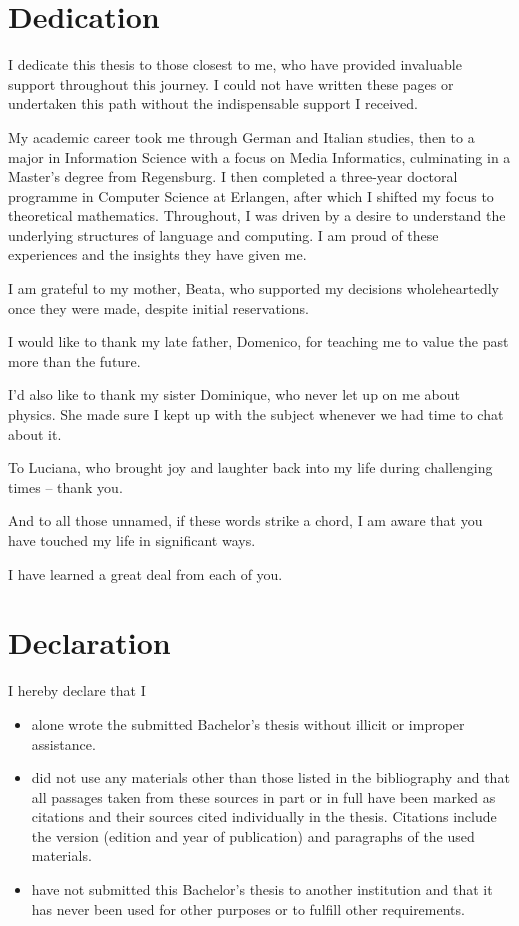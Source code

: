 \documentclass[b5paper, 11pt, twoside]{report}
\begin{document}
\chapter*{Dedication}
I dedicate this thesis to those closest to me, who have provided invaluable support throughout this journey. I could not have written these pages or undertaken this path without the indispensable support I received.

My academic career took me through German and Italian studies, then to a major in Information Science with a focus on Media Informatics, culminating in a Master's degree from Regensburg. I then completed a three-year doctoral programme in Computer Science at Erlangen, after which I shifted my focus to theoretical mathematics. Throughout, I was driven by a desire to understand the underlying structures of language and computing. I am proud of these experiences and the insights they have given me.

I am grateful to my mother, Beata, who supported my decisions wholeheartedly once they were made, despite initial reservations.

I would like to thank my late father, Domenico, for teaching me to value the past more than the future.

I'd also like to thank my sister Dominique, who never let up on me about physics. She made sure I kept up with the subject whenever we had time to chat about it.

To Luciana, who brought joy and laughter back into my life during challenging times -- thank you.

And to all those unnamed, if these words strike a chord, I am aware that you have touched my life in significant ways.

I have learned a great deal from each of you.

\chapter*{Declaration}
I hereby declare that I

\begin{itemize}
	\item alone wrote the submitted Bachelor's thesis without illicit or improper
	      assistance.
	      	      
	\item did not use any materials other than those listed in the bibliography and
	      that all passages taken from these sources in part or in full have been marked
	      as citations and their sources cited individually in the thesis. Citations
	      include the version (edition and year of publication) and paragraphs of the used materials.
	      	      
	\item have not submitted this Bachelor's thesis to another institution and that
	      it has never been used for other purposes or to fulfill other requirements.
\end{itemize}
\end{document}
